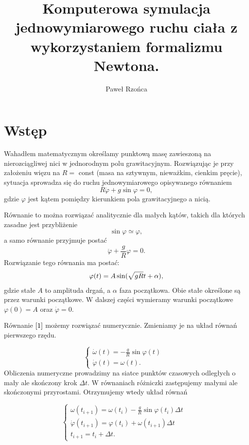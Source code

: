 \documentclass[11pt]{article}
\title{Komputerowa symulacja jednowymiarowego ruchu ciała z wykorzystaniem 
formalizmu Newtona.}
\author{Paweł Rzońca}
\begin{document}
\maketitle

\section*{Wstęp}
Wahadłem matematycznym określamy punktową masę zawieszoną na nierozciągliwej 
nici w jednorodnym polu grawitacyjnym. Rozwiązując je przy założeniu więzu na 
$R = $ const (masa na sztywnym, nieważkim, cienkim pręcie), sytuacja sprowadza się do ruchu jednowymiarowego opisywanego równaniem 
\begin{equation}\label{1}
R \ddot{\varphi} + g\sin \varphi=0, 
\end{equation}
gdzie $\varphi$ jest kątem pomiędzy kierunkiem pola grawitacyjnego a nicią.

Równanie to można rozwiązać analitycznie dla małych kątów, takich dla których 
zasadne jest przybliżenie 
$$\sin \varphi \simeq \varphi,$$
a samo równanie przyjmuje postać 
\begin{equation}
\ddot{\varphi} + \dfrac{g}{R} \varphi = 0.
\end{equation}
Rozwiązanie tego równania ma postać:
\begin{equation} \label{3}
\varphi (t) = A \sin ( \sqrt{g\/R} t +\alpha ),
\end{equation}
gdzie stałe $A$ to amplituda drgań, a $\alpha$ faza początkowa. Obie stałe określone 
są przez warunki początkowe. W dalszej części wymieramy warunki początkowe $\varphi (0)=A$
oraz $\dot{\varphi} = 0$.

Równanie $\ref{1}$ możemy rozwiązać numerycznie. Zmieniamy je na układ równań 
pierwszego rzędu.

$$\begin{cases} 
\dot{\omega} (t) = - \frac{g}{R} \sin \varphi (t) & \\
\dot{\varphi} (t) = \omega (t).
\end{cases}$$
Obliczenia numeryczne prowadzimy na siatce punktów czasowych odległych o mały ale
skończony krok $\Delta t$. W równaniach różniczki zastępujemy małymi ale skończonymi
przyrostami. Otrzymujemy wtedy układ równań

$$\begin{cases} 
\omega (t_{i+1}) = \omega (t_i) - \frac{g}{R} \sin \varphi (t_i) \Delta t & \\
\dot{\varphi} (t_{i+1}) =\varphi (t_i) + \omega (t_{i+1}) \Delta t &\\
t_{i+1}=t_{i} + \Delta t.
\end{cases}$$
\end{document}
